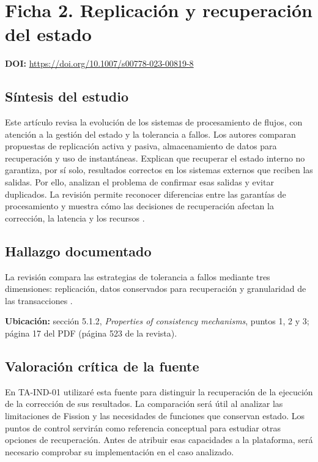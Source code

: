 \documentclass[11pt,a4paper]{article}
\newcommand{\tituloficha}[1]{\Needspace{5\baselineskip}\section*{#1}}
\newcommand{\doificha}[1]{\textbf{DOI:} \url{https://doi.org/#1}\par}
\begin{document}
\clearpage

\tituloficha{Ficha 2. Replicación y recuperación del estado}

\doificha{10.1007/s00778-023-00819-8}

\subsection*{Síntesis del estudio}

Este artículo revisa la evolución de los sistemas de procesamiento de
flujos, con atención a la gestión del estado y la tolerancia a fallos. Los
autores comparan propuestas de replicación activa y pasiva, almacenamiento
de datos para recuperación y uso de instantáneas. Explican que recuperar el
estado interno no garantiza, por sí solo, resultados correctos en los
sistemas externos que reciben las salidas. Por ello, analizan el problema de
confirmar esas salidas y evitar duplicados. La revisión permite reconocer
diferencias entre las garantías de procesamiento y muestra cómo las
decisiones de recuperación afectan la corrección, la latencia y los recursos
\cite{fragkoulis_survey_2024}.

\subsection*{Hallazgo documentado}

La revisión compara las estrategias de tolerancia a fallos
mediante tres dimensiones: replicación, datos conservados
para recuperación y granularidad de las transacciones
\cite{fragkoulis_survey_2024}.

\textbf{Ubicación:} sección 5.1.2,
\textit{Properties of consistency mechanisms},
puntos 1, 2 y 3; página 17 del PDF (página 523 de la revista).

\subsection*{Valoración crítica de la fuente}

En TA-IND-01 utilizaré esta fuente para distinguir la recuperación de la
ejecución de la corrección de sus resultados. La comparación será útil al
analizar las limitaciones de Fission y las necesidades de funciones que
conservan estado. Los puntos de control servirán como referencia conceptual
para estudiar otras opciones de recuperación. Antes de atribuir esas
capacidades a la plataforma, será necesario comprobar su implementación en
el caso analizado.
\end{document}
